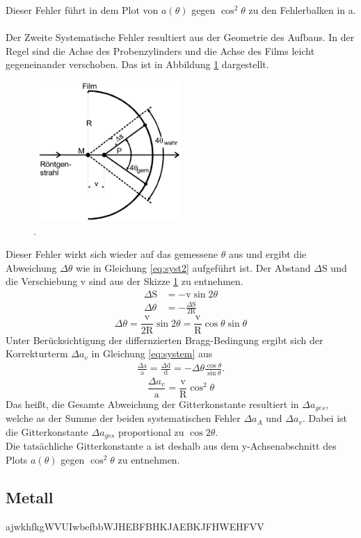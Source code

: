 Dieser Fehler führt in dem Plot von $a(\theta)$ gegen $\cos^2{\theta}$ zu den Fehlerbalken in a.
\\\\
Der Zweite Systematische Fehler resultiert aus der Geometrie des Aufbaus.
In der Regel sind die Achse des Probenzylinders und die Achse des Films leicht gegeneinander verschoben. 
Das ist in Abbildung \ref{fig:sys2} dargestellt.
\begin{figure}
\centering
	\includegraphics[width = 0.5\textwidth]{Abbildungen/Syst2.png}
	\caption{\cite{Anleitung}.}
	\label{fig:sys2}
\end{figure}
Dieser Fehler wirkt sich wieder auf das gemessene $\theta$ aus und ergibt die Abweichung $\Delta \theta$ wie in Gleichung \ref{eq:syst2} aufgeführt ist.
Der Abstand $\Delta$S und die Verschiebung v sind aus der Skizze \ref{fig:sys2} zu entnehmen.
\begin{align*}
\Delta \text{S} &  = -\text{v} \sin{2 \theta} \\
\Delta \theta & = -\frac{\Delta \text{S}}{2\text{R}}
\end{align*}
\begin{equation}
\Delta \theta = \frac{\text{v}}{2\text{R}}\sin{2\theta} = \frac{\text{v}}{\text{R}}\cos{\theta}\sin{\theta}
\label{eq:syst2}
\end{equation}
Unter Berücksichtigung der differnzierten Bragg-Bedingung ergibt sich der Korrekturterm $\Delta a_v$ in Gleichung \ref{eq:system} aus
\begin{align*}
\frac{\Delta \text{a}}{\text{a}} = \frac{\Delta \text{d}}{\text{d}} = -\Delta \theta \frac{\cos{\theta}}{\sin{\theta}}.
\end{align*}
\begin{equation}
\frac{\Delta a_v}{\text{a}} = \frac{\text{v}}{\text{R}}\cos^2{\theta}
\label{eq:system}
\end{equation}
Das heißt, die Gesamte Abweichung der Gitterkonstante resultiert in $\Delta a_{ges}$, welche as der Summe der beiden systematischen Fehler $\Delta a_A$ und $\Delta a_v$. 
Dabei ist die Gitterkonstante $\Delta a_{ges}$ proportional zu $\cos2{\theta}$.\\
Die tatsächliche Gitterkonstante a ist deshalb aus dem y-Achsenabschnitt des Plots $a(\theta)$ gegen $\cos^2{\theta}$ zu entnehmen.
\subsection{Metall}

ajwkhfkgWVUIwbefbbWJHEBFBHKJAEBKJFHWEHFVV